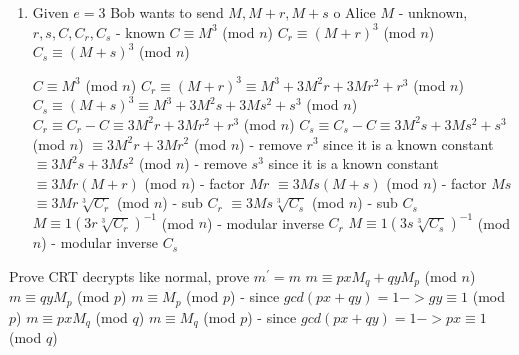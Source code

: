 \documentclass{assignment}
\begin{document}
\begin{problemlist}
\begin{problem}
\begin{enumerate}
\item
Given $e = 3$ Bob wants to send $M, M+r,M+s$ o Alice \newline
$M$ - unknown, $r,s,C,C_r,C_s$ - known \newline
$C  \equiv M^3$ (mod $n$) \newline
$C_r \equiv (M + r)^3$  (mod $n$) \newline
$C_s \equiv (M + s)^3$  (mod $n$) \newline

$C \equiv M^3$  (mod $n$) \newline
$C_r \equiv (M + r)^3 \equiv M^3 + 3M^2r + 3Mr^2 + r^3$  (mod $n$) \newline
$C_s \equiv (M + s)^3 \equiv M^3 + 3M^2s + 3Ms^2 + s^3$  (mod $n$) \newline
$C_r \equiv C_r - C \equiv 3M^2r + 3Mr^2 + r^3$  (mod $n$) \newline
$C_s \equiv C_s - C \equiv 3M^2s + 3Ms^2 + s^3$  (mod $n$) \newline
$\equiv 3M^2r + 3Mr^2$  (mod $n$) - remove $r^3$ since it is a known constant \newline
$\equiv 3M^2s + 3Ms^2$  (mod $n$) - remove $s^3$ since it is a known constant \newline
$\equiv 3Mr(M + r)$  (mod $n$) - factor $Mr$\newline
$\equiv 3Ms(M + s)$  (mod $n$) - factor $Ms$ \newline
$\equiv 3Mr\sqrt[3]{C_r}$  (mod $n$) - sub $C_r$ \newline
$\equiv 3Ms\sqrt[3]{C_s}$  (mod $n$) - sub $C_s$ \newline
$M \equiv 1(3r\sqrt[3]{C_r})^{-1}$  (mod $n$) - modular inverse $C_r$ \newline
$M \equiv 1(3s\sqrt[3]{C_s})^{-1}$  (mod $n$) - modular inverse $C_s$ \newline

\end{enumerate}
\clearpage
\end{problem}

\begin{problem}
\pbitem

\begin{enumerate}

Prove CRT decrypts like normal, prove $m^{\prime} = m$ \newline
$ m \equiv pxM_q + qyM_p$ (mod $n$) \newline
$ m \equiv qyM_p$ (mod $p$) \newline
$ m \equiv M_p$ (mod $p$) - since $gcd(px + qy) = 1 -> gy \equiv 1$ (mod $p$)  \newline
$ m \equiv pxM_q$  (mod $q$) \newline
$ m \equiv M_q$ (mod $p$) - since $gcd(px + qy) = 1 -> px \equiv 1$ (mod $q$)  \newline


\end{enumerate}
\end{problem}
\end{problemlist}
\end{document}
